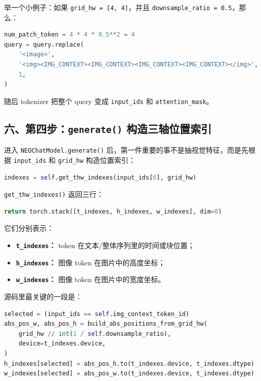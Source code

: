 举一个小例子：如果 \texttt{grid\_hw = [4, 4]}，并且 \texttt{downsample\_ratio = 0.5}，那么：

\begin{lstlisting}[language=Python]
num_patch_token = 4 * 4 * 0.5**2 = 4
query = query.replace(
    '<image>',
    '<img><IMG_CONTEXT><IMG_CONTEXT><IMG_CONTEXT><IMG_CONTEXT></img>',
    1,
)
\end{lstlisting}

随后 tokenizer 把整个 query 变成 \texttt{input\_ids} 和 \texttt{attention\_mask}。

\subsection{六、第四步：\texttt{generate()} 构造三轴位置索引}

进入 \texttt{NEOChatModel.generate()} 后，第一件重要的事不是抽视觉特征，而是先根据 \texttt{input\_ids} 和 \texttt{grid\_hw} 构造位置索引：

\begin{lstlisting}[language=Python]
indexes = self.get_thw_indexes(input_ids[0], grid_hw)
\end{lstlisting}

\texttt{get\_thw\_indexes()} 返回三行：

\begin{lstlisting}[language=Python]
return torch.stack([t_indexes, h_indexes, w_indexes], dim=0)
\end{lstlisting}

它们分别表示：

\begin{itemize}[leftmargin=1.5em]
  \item \textbf{\texttt{t\_indexes}：} token 在文本/整体序列里的时间或块位置；
  \item \textbf{\texttt{h\_indexes}：} 图像 token 在图片中的高度坐标；
  \item \textbf{\texttt{w\_indexes}：} 图像 token 在图片中的宽度坐标。
\end{itemize}

源码里最关键的一段是：

\begin{lstlisting}[language=Python]
selected = (input_ids == self.img_context_token_id)
abs_pos_w, abs_pos_h = build_abs_positions_from_grid_hw(
    grid_hw // int(1 / self.downsample_ratio),
    device=t_indexes.device,
)
h_indexes[selected] = abs_pos_h.to(t_indexes.device, t_indexes.dtype)
w_indexes[selected] = abs_pos_w.to(t_indexes.device, t_indexes.dtype)
\end{lstlisting}

